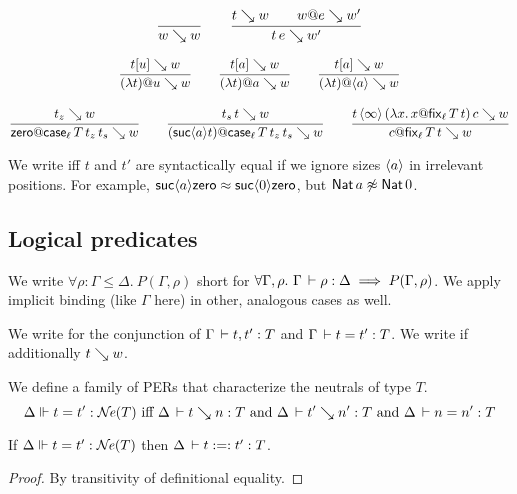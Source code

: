 \documentclass[acmlarge,review,anonymous]{acmart}\settopmatter{printfolios=true}
\begin{document}
\begin{gather*}
  \ru{}{w \evalsto w}
\qquad
  \ru{t \evalsto w \qquad w @ e \evalsto w'}{t\,e \evalsto w'}
\end{gather*}


\begin{gather*}
  \ru{t[u] \evalsto w
    }{(\lambda t) @ u \evalsto w}
\qquad
  \ru{t[a] \evalsto w
    }{(\lambda t) @ a \evalsto w}
\qquad
  \ru{t[a] \evalsto w
    }{(\lambda t) @ \ann a \evalsto w}
\\[2ex]
  \ru{t_z \evalsto w
    }{\tzero @ \casett \evalsto w}
\qquad
  \ru{t_s\, t \evalsto w
    }{(\suc a t) @ \casett \evalsto w}
\qquad
  \ru{t\,\ann\infty\,(\lambda x.\, x@ \fixtt)\,c \evalsto w
     }{c @ \fixtt \evalsto w
     }%
\end{gather*}

We write  iff $t$ and $t'$ are syntactically equal if we ignore sizes $\langle a\rangle$ in irrelevant positions.  For example, $\mathsf{suc}\langle a\rangle \mathsf{zero} \approx \mathsf{suc}\langle0\rangle \mathsf{zero}$, but $\mathsf{Nat}\, a \not\approx \mathsf{Nat}\, 0$.


\subsection{Logical predicates}

We write $\forall \rho : \Gamma \leq \Delta.~ P(\Gamma,\rho)$ short for
$\forall \Gamma, \rho.~ \Gamma \,\vdash \rho : \Delta \implies P(\Gamma,\rho)$.
We apply implicit binding (like $\Gamma$ here) in other, analogous cases as well.

We write  for the conjunction of $\Gamma \,\vdash t,t' : T$ and $\Gamma \,\vdash t = t' : T$.  We write  if additionally $t \searrow w$.

We define a family of PERs  that characterize the neutrals of type $T$.
\[
  \sneq \Delta t {t'} T \miff %
    \Delta \der t  \evalsto n  : T \mand
    \Delta \der t' \evalsto n' : T \mand
    \Delta \der n = n' : T
\]
\begin{lemma}[Soundness of $\NE$]
  If\/ $\Delta \Vdash t = t' : \mathcal{N}\!\mathit{e}(T)$ then $\Delta \,\vdash t :=: t' : T$.
\end{lemma}
\begin{proof}
  By transitivity of definitional equality.
\end{proof}
\end{document}
